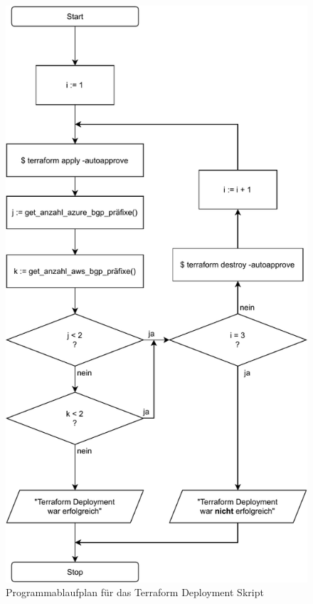 \begin{figure}[h]
  \centering
  \includegraphics[scale=0.6]{Figures/programmablaufplan_bash_deploy_tf.pdf}
  \caption{Programmablaufplan für das Terraform \gls{Deployment} Skript}
  \label{grafik:programmablaufplan_bash_deploy_tf}
\end{figure}\FloatBarrier

